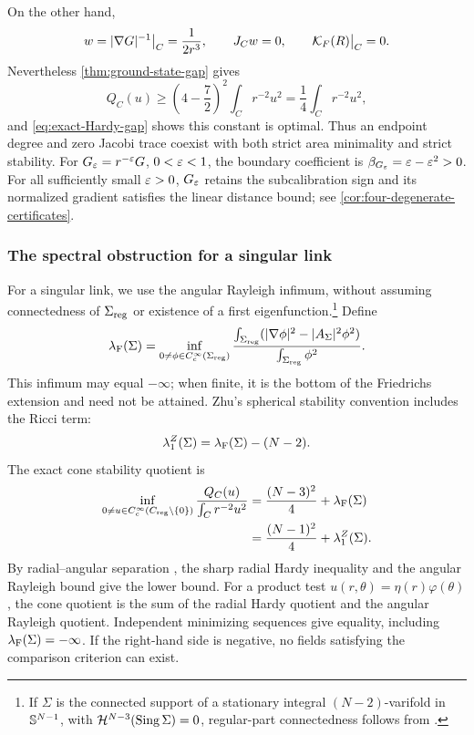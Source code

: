 On the other hand,
\[
 w=|\nabla G|^{-1}\big|_C=\frac1{2r^3},\qquad
 J_Cw=0,\qquad \mathcal K_F(R)\big|_C=0.
\]
Nevertheless \cref{thm:ground-state-gap} gives
\[
 Q_C(u)\geq\left(4-\frac72\right)^2\int_Cr^{-2}u^2
 =\frac14\int_Cr^{-2}u^2,
\]
and \eqref{eq:exact-Hardy-gap} shows this constant is optimal.
Thus an endpoint degree and zero Jacobi trace coexist with both
strict area minimality and strict stability.
For \(G_\varepsilon=r^{-\varepsilon}G\), \(0<\varepsilon<1\), the boundary coefficient
is \(\beta_{G_\varepsilon}=\varepsilon-\varepsilon^2>0\).
For all sufficiently small \(\varepsilon>0\), \(G_\varepsilon\) retains the
subcalibration sign and its normalized gradient satisfies the linear
distance bound; see \cref{cor:four-degenerate-certificates}.

\subsubsection*{The spectral obstruction for a singular link}
For a singular link, we use the angular Rayleigh infimum, without
assuming connectedness of \(\Sigma_{\mathrm{reg}}\) or existence of a first
eigenfunction.\footnote{If \(\Sigma\) is the connected support of a stationary
integral \((N-2)\)-varifold in \(\mathbb S^{N-1}\), with
\(\mathcal H^{N-3}(\operatorname{Sing}\Sigma)=0\), regular-part connectedness follows from
\cite[Lemma~2.2]{Zhu18}.}
Define
\begin{equation}\label{eq:Friedrichs-bottom}
 \lambda_{\rm F}(\Sigma)=
 \inf_{0\neq\phi\in C_c^\infty(\Sigma_{\rm reg})}
 \frac{\int_{\Sigma_{\rm reg}}
 (|\nabla\phi|^2-|A_\Sigma|^2\phi^2)}
 {\int_{\Sigma_{\rm reg}}\phi^2}.
\end{equation}
This infimum may equal \(-\infty\); when finite, it is the bottom of
the Friedrichs extension and need not be attained.
Zhu's spherical stability convention
\cite[Section~2.1.5, equation~(2.8)]{Zhu18} includes the Ricci term:
\[
 \lambda_1^{Z}(\Sigma)=\lambda_{\rm F}(\Sigma)-(N-2).
\]
The exact cone stability quotient is
\begin{equation}\label{eq:exact-Hardy-gap}
\begin{aligned}
 \inf_{0\neq u\in C_c^\infty(C_{\rm reg}\setminus\{0\})}
 \frac{Q_C(u)}{\int_Cr^{-2}u^2}
 &=\frac{(N-3)^2}{4}+\lambda_{\rm F}(\Sigma)\\
 &=\frac{(N-1)^2}{4}+\lambda_1^{Z}(\Sigma).
\end{aligned}
\end{equation}
By radial--angular separation \cite{Simons68,CabrePoggesi18},
the sharp radial Hardy inequality and the angular Rayleigh bound give
the lower bound. For a product
test \(u(r,\theta)=\eta(r)\varphi(\theta)\), the cone quotient is
the sum of the radial Hardy quotient and the angular Rayleigh
quotient. Independent minimizing sequences give equality, including
\(\lambda_{\rm F}(\Sigma)=-\infty\).
If the right-hand side is negative, no fields satisfying the
comparison criterion can exist.

